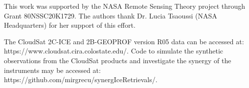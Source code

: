 \documentclass{ametsocV6.1}
\begin{document}

%


%

\clearpage
\acknowledgments
This work was supported by the NASA Remote Sensing Theory project through Grant 80NSSC20K1729. 
The authors thank Dr. Lucia Tsaoussi (NASA Headquarters) for her support of this effort.

% 
%
\datastatement
The CloudSat 2C-ICE and 2B-GEOPROF version R05 data can be accessed at: https://www.cloudsat.cira.colostate.edu/. Code to simulate the synthetic observations from the CloudSat products and investigate the synergy of the instruments may be accessed at:  https://github.com/mirgrecu/synergIceRetrievals/.
\end{document}

